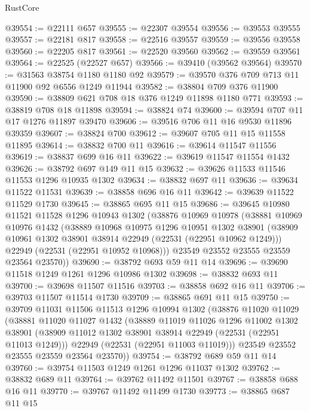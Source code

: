 \begin{lexlean}{RustCore}
\begin{coremodule}
@39554 := @22111 @657
@39555 := @22307 @39554
@39556 := @39553 @39555
@39557 := @22181 @817
@39558 := @22516 @39557
@39559 := @39556 @39558
@39560 := @22205 @817
@39561 := @22520 @39560
@39562 := @39559 @39561
@39564 := @22525 (@22527 @657)
@39566 := @39410 (@39562 @39564)
@39570 := @31563 @38754 @1180 @1180 @92
@39579 := @39570 @376 @709 @713 @11 @11900 @92 @6556 @1249 @11944
@39582 := @38804 @709 @376 @11900
@39590 := @38809 @621 @708 @18 @376 @1249 @11898 @1180 @771
@39593 := @38819 @708 @18 @11898
@39594 := @38824 @74
@39600 := @39594 @707 @11 @17 @1276 @11897 @39470
@39606 := @39516 @706 @11 @16 @9530 @11896 @39359
@39607 := @38824 @700
@39612 := @39607 @705 @11 @15 @11558 @11895
@39614 := @38832 @700 @11
@39616 := @39614 @11547 @11556
@39619 := @38837 @699 @16 @11
@39622 := @39619 @11547 @11554 @1432
@39626 := @38792 @697 @149 @11 @15
@39632 := @39626 @11533 @11546 @11553 @1296 @10935 @1302
@39634 := @38832 @697 @11
@39636 := @39634 @11522 @11531
@39639 := @38858 @696 @16 @11
@39642 := @39639 @11522 @11529 @1730
@39645 := @38865 @695 @11 @15
@39686 := @39645
    @10980
    @11521
    @11528
    @1296
    @10943
    @1302
    (@38876
      @10969
      @10978
      (@38881
        @10969
        @10976
        @1432
        (@38889
          @10968
          @10975
          @1296
          @10951
          @1302
          @38901
          (@38909 @10961 @1302 @38901 @38914 @22949 (@22531 (@22951 @10962 @1249)))
          @22949
          (@22531 (@22951 @10952 @10968)))
        @23549
        @23552
        @23555
        @23559
        @23564
        @23570))
@39690 := @38792 @693 @59 @11 @14
@39696 := @39690 @11518 @1249 @1261 @1296 @10986 @1302
@39698 := @38832 @693 @11
@39700 := @39698 @11507 @11516
@39703 := @38858 @692 @16 @11
@39706 := @39703 @11507 @11514 @1730
@39709 := @38865 @691 @11 @15
@39750 := @39709
    @11031
    @11506
    @11513
    @1296
    @10994
    @1302
    (@38876
      @11020
      @11029
      (@38881
        @11020
        @11027
        @1432
        (@38889
          @11019
          @11026
          @1296
          @11002
          @1302
          @38901
          (@38909 @11012 @1302 @38901 @38914 @22949 (@22531 (@22951 @11013 @1249)))
          @22949
          (@22531 (@22951 @11003 @11019)))
        @23549
        @23552
        @23555
        @23559
        @23564
        @23570))
@39754 := @38792 @689 @59 @11 @14
@39760 := @39754 @11503 @1249 @1261 @1296 @11037 @1302
@39762 := @38832 @689 @11
@39764 := @39762 @11492 @11501
@39767 := @38858 @688 @16 @11
@39770 := @39767 @11492 @11499 @1730
@39773 := @38865 @687 @11 @15

\end{coremodule}
\end{lexlean}
